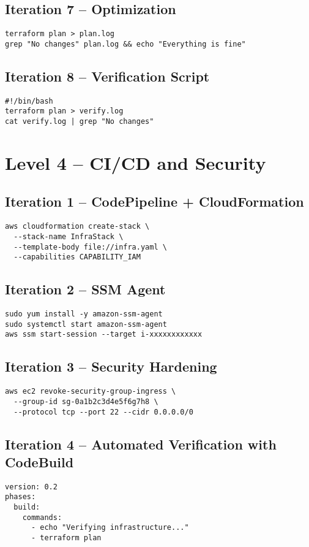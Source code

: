 \documentclass{article}
\begin{document}
\subsection{Iteration 7 – Optimization}
\begin{verbatim}
terraform plan > plan.log
grep "No changes" plan.log && echo "Everything is fine"
\end{verbatim}

\subsection{Iteration 8 – Verification Script}
\begin{verbatim}
#!/bin/bash
terraform plan > verify.log
cat verify.log | grep "No changes"
\end{verbatim}

\section{Level 4 – CI/CD and Security}

\subsection{Iteration 1 – CodePipeline + CloudFormation}
\begin{verbatim}
aws cloudformation create-stack \
  --stack-name InfraStack \
  --template-body file://infra.yaml \
  --capabilities CAPABILITY_IAM
\end{verbatim}

\subsection{Iteration 2 – SSM Agent}
\begin{verbatim}
sudo yum install -y amazon-ssm-agent
sudo systemctl start amazon-ssm-agent
aws ssm start-session --target i-xxxxxxxxxxxx
\end{verbatim}

\subsection{Iteration 3 – Security Hardening}
\begin{verbatim}
aws ec2 revoke-security-group-ingress \
  --group-id sg-0a1b2c3d4e5f6g7h8 \
  --protocol tcp --port 22 --cidr 0.0.0.0/0
\end{verbatim}

\subsection{Iteration 4 – Automated Verification with CodeBuild}
\begin{verbatim}
version: 0.2
phases:
  build:
    commands:
      - echo "Verifying infrastructure..."
      - terraform plan
\end{verbatim}
\end{document}
